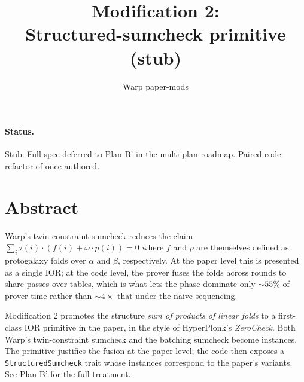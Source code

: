\documentclass{article}
\title{Modification 2: \\ Structured-sumcheck primitive (stub)}
\author{Warp paper-mods}
\date{}
\begin{document}
\maketitle

\paragraph{Status.} Stub. Full spec deferred to Plan B' in the multi-plan
roadmap. Paired code: refactor of
 once authored.

\section*{Abstract}

Warp's twin-constraint sumcheck reduces the claim
\(\sum_i \tau(i) \cdot (f(i) + \omega \cdot p(i)) = 0\)
where \(f\) and \(p\) are themselves defined as protogalaxy folds over
\(\alpha\) and \(\beta\), respectively. At the paper level this is presented
as a single \Sumcheck{} IOR; at the code level, the prover fuses the folds
across rounds to share passes over tables, which is what lets the phase
dominate only \(\sim 55\%\) of prover time rather than \(\sim 4\times\)
that under the naive sequencing.

Modification 2 promotes the structure \emph{sum of products of linear
folds} to a first-class IOR primitive in the paper, in the style of
HyperPlonk's \emph{ZeroCheck}. Both Warp's twin-constraint sumcheck and
the batching sumcheck become instances. The primitive justifies the
fusion at the paper level; the code then exposes a
\texttt{StructuredSumcheck} trait whose instances correspond to the
paper's variants. See Plan B' for the full treatment.
\end{document}
